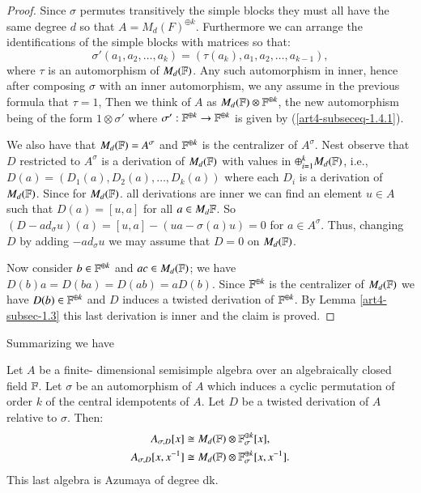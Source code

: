 \begin{proof}
Since $\sigma$ permutes transitively the simple blocks they must all have the same degree $d$ so that $A=M_{d}(F)^{\oplus k}$. Furthermore we can arrange the identifications of the simple blocks with matrices so that: 
$$
\sigma'(a_{1}, a_{2},\ldots, a_{k}) = (\tau(a_{k}),a_{1}, a_{2}, \ldots, a_{k-1}),
$$
where $\tau$ is an automorphism of $M_{d}(\mathbb{F})$. Any such automorphism in inner, hence after composing $\sigma$ with an inner automorphism, we any assume in the previous formula that $\tau =1$, Then we think of $A$ as $M_{d}(\mathbb{F})\otimes \mathbb{F}^{\oplus k}$, the new automorphism being of the form $1\otimes \sigma'$ where $\sigma':\mathbb{F}^{\oplus k} \rightarrow
 \mathbb{F}^{\oplus k}$ is given by (\ref{art4-subseceq-1.4.1}).

 We also have that $M_{d}(\mathbb{F}) = A^{\sigma}$ and $\mathbb{F}^{\oplus k}$ is the centralizer of $A^{\sigma}$. Nest observe that $D$ restricted to $A^{\sigma}$ is a derivation of $M_{d}(\mathbb{F})$ with values in $\oplus_{i=1}^{k}M_{d}(\mathbb{F})$, i.e., $D(a)= (D_{1}(a), D_{2}(a), \ldots, D_{k}(a))$ where each $D_{i}$ is a derivation of $M_{d}(\mathbb{F})$. Since for $M_{d}(\mathbb{F})$. all derivations are inner we can find an element $u \in A$ such that $D(a) =[u,a]$ for all $a\in M_{d}\mathbb{F}$. So $(D-ad_{\sigma}u)(a) = [u,a]-(ua-\sigma(a)u)=0$ for $a\in A^{\sigma}$. Thus, changing $D$ by adding $-ad_{\sigma}u$ we may assume that $D=0$ on $M_{d}(\mathbb{F})$.

 Now consider $b \in \mathbb{F}^{\oplus k}$ and $ac\in M_{d}(\mathbb{F})$; we have $D(b)a = D(ba) = D(ab) =aD(b)$. Since $\mathbb{F}^{\oplus k}$ is the centralizer of $M_{d}(\mathbb{F})$ we have $D(b)\in \mathbb{F}^{\oplus k}$ and $D$ induces a twisted derivation of $\mathbb{F}^{\oplus k}$. By Lemma \ref{art4-subsec-1.3} this last derivation is inner and the claim is proved.
\end{proof}

Summarizing we have

\begin{prop*}
Let $A$ be a finite- dimensional semisimple algebra over an algebraically closed field $\mathbb{F}$. Let $\sigma$ be an automorphism of $A$ which induces a cyclic permutation of order $k$ of the central idempotents of $A$. Let $D$ be a twisted derivation of $A$ relative to $\sigma$. Then:
\begin{gather*}
 A_{\sigma,D}[x] \cong M_{d}(\mathbb{F})\otimes \mathbb{F}_{\sigma}^{\oplus k}[x],\\
 A_{\sigma,D}[x, x^{-1}]\cong M_{d}(\mathbb{F})\otimes \mathbb{F}_{\sigma}^{\oplus k}[x, x^{-1}].
\end{gather*}
This last algebra is Azumaya of degree dk.
\end{prop*}

